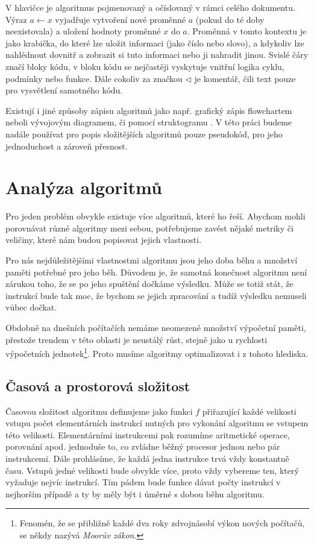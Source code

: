 \documentclass[12pt]{report}			%
\begin{document}
				V hlavičce je algoritmus pojmenovaný a očíslovaný v rámci celého dokumentu. Výraz $a \gets x$ vyjadřuje vytvoření nové proměnné $a$ (pokud do té doby neexistovala) a uložení hodnoty proměnné $x$ do $a$. Proměnná v tomto kontextu je jako krabička, do které lze uložit informaci (jako číslo nebo slovo), a kdykoliv lze nahlédnout dovnitř a zobrazit si tuto informaci nebo ji nahradit jinou. Svislé čáry značí bloky kódu, v bloku kódu se nejčastěji vyskytuje vnitřní logika cyklu, podmínky nebo funkce. Dále cokoliv za značkou $\lhd$ je komentář, čili text pouze pro vysvětlení samotného kódu.				
				

				Existují i jiné způsoby zápisu algoritmů jako např. grafický zápis flowchartem neboli vývojovým diagramem, či pomocí struktogramu \cite{zaklady}. V této práci budeme nadále používat pro popis složitějších algoritmů pouze pseudokód, pro jeho jednoduchost a zároveň přesnost.
				
					
		\chapter{Analýza algoritmů}
		Pro jeden problém obvykle existuje více algoritmů, které ho řeší. Abychom mohli porovnávat různé algoritmy mezi sebou, potřebujeme  zavést nějaké metriky či veličiny, které nám budou popisovat jejich vlastnosti. 
		
		Pro nás nejdůležitějšími vlastnostmi algoritmu jsou jeho doba běhu a množství paměti potřebné pro jeho běh. Důvodem je, že samotná konečnost algoritmu není zárukou toho, že se po jeho spuštění dočkáme výsledku. Může se totiž stát, že instrukcí bude tak moc, že bychom se jejich zpracování a tudíž výsledku nemuseli vůbec dočkat.
		
		Obdobně na dnešních počítačích nemáme neomezené množství výpočetní paměti, přestože trendem v této oblasti je neustálý růst, stejně jako u rychlosti výpočetních jednotek\footnote{Fenomén, že se přibližně každé dva roky zdvojnásobí výkon nových počítačů, se někdy nazývá \emph{Moorův zákon}.}. Proto musíme algoritmy optimalizovat i z tohoto hlediska. \cite{cerny}
		
		
			\section{Časová a  prostorová složitost}
			
			Časovou složitost algoritmu definujeme jako funkci $f$ přiřazující každé velikosti vstupu počet elementárních instrukcí nutných pro vykonání algoritmu se vstupem této velikosti. Elementárními instrukcemi pak rozumíme aritmetické operace, porovnání apod. jednoduše to, co zvládne běžný procesor jednou nebo pár instrukcemi. 
			Dále prohlásíme, že každá jedna instrukce trvá vždy konstantně času. Vstupů jedné velikosti bude obvykle více, proto vždy vybereme ten, který vyžaduje nejvíc instrukcí. Tím pádem bude funkce dávat počty instrukcí v nejhorším případě a ty by měly být i úměrné s dobou běhu algoritmu. \cite{pruvodce}
			
\end{document}
